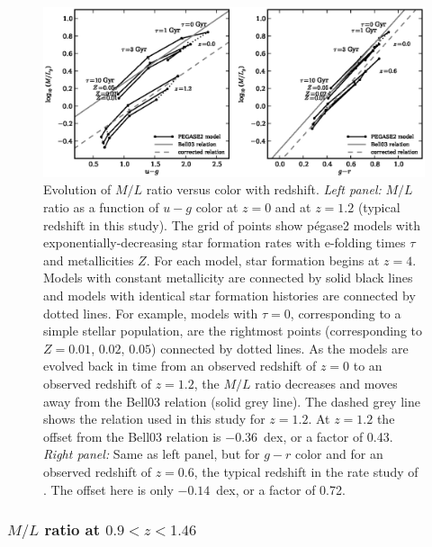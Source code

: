 \begin{figure}
\includegraphics[width=\textwidth]{figures/clrate/mlratio.eps}
\caption[Evolution of $M/L$ ratio versus color with redshift]
{Evolution of $M/L$ ratio versus color with redshift. 
\emph{Left panel:} $M/L$ ratio as a function of $u-g$ color 
at $z=0$ and at $z=1.2$ (typical redshift in this study). The grid of
points show {\sc p{\'e}gase2} models with exponentially-decreasing
star formation rates with e-folding times $\tau$ and metallicities
$Z$. For each model, star formation begins at $z=4$. Models with
constant metallicity are connected by solid black lines and models
with identical star formation histories are connected by dotted
lines. For example, models with $\tau = 0$, corresponding to a simple
stellar population, are the rightmost points (corresponding to
$Z=0.01$, $0.02$, $0.05$) connected by dotted lines. As the models are
evolved back in time from an observed redshift of $z=0$ to an observed
redshift of $z=1.2$, the $M/L$ ratio decreases and moves away
from the Bell03 relation (solid grey line). The dashed
grey line shows the relation used in this study for $z=1.2$. At
$z=1.2$ the offset from the Bell03 relation is $-0.36$~dex, or a
factor of 0.43. \emph{Right panel:} Same as left panel, but for $g-r$
color and for an observed redshift of $z=0.6$, the typical redshift in
the rate study of \citet{sharon10a}. The offset here is only
$-0.14$~dex, or a factor of 0.72.
\label{fig:mlratio}}
\end{figure}

\subsubsection{$M/L$ ratio at $0.9<z<1.46$}

